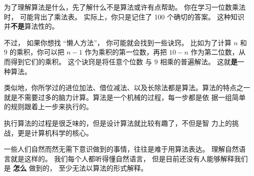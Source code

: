 为了理解算法是什么，先了解什么不是算法或许有点帮助。 你在学习一位数乘法时，
可能背出了乘法表。 实际上，你只是记住了 100 个确切的答案。 这种知识并{\bf 不是}算法性的。


不过， 如果你想找 ``懒人方法''， 你可能就会找到一些诀窍。 比如为了计算 $n$
和 $9$ 的乘积，你可以把 $n-1$ 作为乘积的第一位数，再把 $10-n$
作为第二位数，从而得到它们的乘积。 这个诀窍是将任意个位数
与 $9$ 相乘的普遍解法。 这就{\bf 是}一种算法。
  
  


类似地，你所学过的进位加法、借位减法、以及长除法都是算法。算法的特点之一
就是不需要过多的脑力计算。算法是一个机械的过程，每一步都是依
据一组简单的规则跟着上一步来执行的。


执行算法的过程是很乏味的，但是设计算法就比较有趣了，不但是智
力上的挑战，更是计算机科学的核心。


一些人们自然而然无需下意识做到的事情，往往是难于用算法表达。 理解自然语言就是这样的。 我们每个人都听得懂自然语言， 但是目前还没有人能够解释我们是 {\bf 怎么} 做到的， 至少无法以算法的形式解释。

